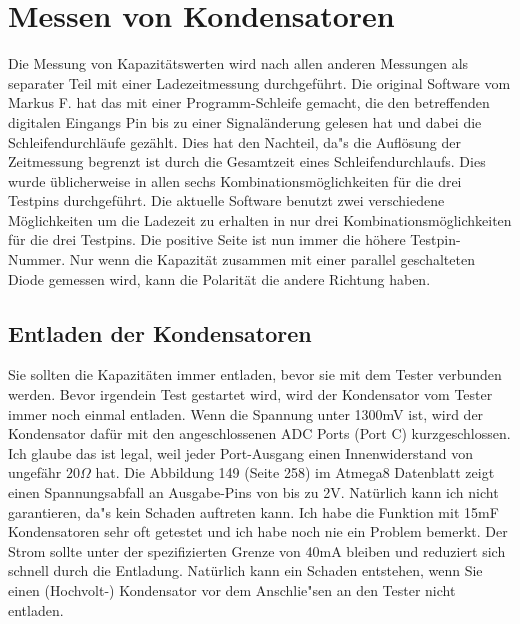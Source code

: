 \section{Messen von Kondensatoren}
Die Messung von Kapazit\"atswerten wird nach allen anderen Messungen als separater Teil mit einer Ladezeitmessung 
durchgef\"uhrt.
Die original Software vom Markus F. hat das mit einer Programm-Schleife gemacht, die den betreffenden digitalen
Eingangs Pin bis zu einer Signal\"anderung gelesen hat und dabei die Schleifendurchl\"aufe gez\"ahlt.
Dies hat den Nachteil, da"s die Aufl\"osung der Zeitmessung begrenzt ist durch die Gesamtzeit eines Schleifendurchlaufs.
Dies wurde \"ublicherweise in allen sechs Kombinationsm\"oglichkeiten f\"ur die drei Testpins durchgef\"uhrt.
Die aktuelle Software benutzt zwei verschiedene M\"oglichkeiten um die Ladezeit zu erhalten in nur drei
Kombinationsm\"oglichkeiten f\"ur die drei Testpins.
Die positive Seite ist nun immer die h\"ohere Testpin-Nummer.
Nur wenn die Kapazit\"at zusammen mit einer parallel geschalteten Diode gemessen wird,
kann die Polarit\"at die andere Richtung haben.

\subsection{Entladen der Kondensatoren}
Sie sollten die Kapazit\"aten immer entladen, bevor sie mit dem Tester verbunden werden.
Bevor irgendein Test gestartet wird, wird der Kondensator vom Tester immer noch einmal entladen.
Wenn die Spannung unter 1300mV ist, wird der Kondensator daf\"ur mit den angeschlossenen ADC Ports (Port C) kurzgeschlossen.
Ich glaube das ist legal, weil jeder Port-Ausgang einen Innenwiderstand von ungef\"ahr \(20\Omega\) hat.
Die Abbildung 149 (Seite 258) im Atmega8 Datenblatt \cite{ATmega8} zeigt einen Spannungsabfall an Ausgabe-Pins von bis zu 2V.
Nat\"urlich kann ich nicht garantieren, da"s kein Schaden auftreten kann.
Ich habe die Funktion mit 15mF Kondensatoren sehr oft getestet und ich habe noch nie ein Problem bemerkt.
Der Strom sollte unter der spezifizierten Grenze von 40mA bleiben und reduziert sich schnell durch die Entladung.
Nat\"urlich kann ein Schaden entstehen, wenn Sie einen (Hochvolt-) Kondensator vor dem Anschlie"sen an den Tester nicht entladen.

